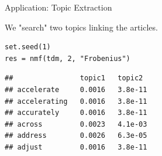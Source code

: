 \documentclass[11pt,compress,t,notes=noshow, xcolor=table]{beamer}
\begin{document}
\begin{vbframe}{Application: Topic Extraction}


\framebreak

We "search" two topics linking the articles.
\vspace{0.2cm}

\begin{footnotesize}
\begin{verbatim}
set.seed(1)
res = nmf(tdm, 2, "Frobenius")
\end{verbatim}


\lz
\begin{verbatim}
##                topic1   topic2
## accelerate     0.0016   3.8e-11
## accelerating   0.0016   3.8e-11
## accurately     0.0016   3.8e-11
## across         0.0023   4.1e-03
## address        0.0026   6.3e-05
## adjust         0.0016   3.8e-11
\end{verbatim}
\end{footnotesize}




\normalsize
\end{vbframe}
\end{document}
